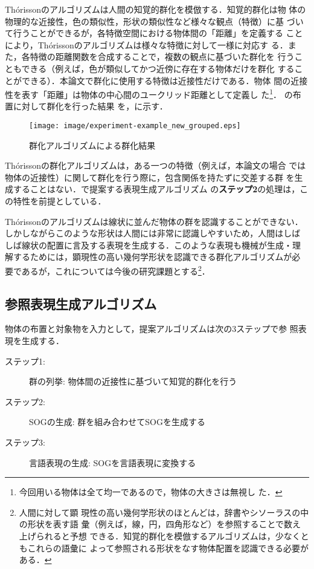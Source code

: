 \documentclass{nlp}
\begin{document}
Th\'{o}rissonのアルゴリズムは人間の知覚的群化を模倣する．知覚的群化は物
体の物理的な近接性，色の類似性，形状の類似性など様々な観点（特徴）に基
づいて行うことができるが，各特徴空間における物体間の「距離」を定義する
ことにより，Th\'{o}rissonのアルゴリズムは様々な特徴に対して一様に対応す
る．また，各特徴の距離関数を合成することで，複数の観点に基づいた群化を
行うこともできる（例えば，色が類似してかつ近傍に存在する物体だけを群化
することができる）．本論文で群化に使用する特徴は近接性だけである．物体
間の近接性を表す「距離」は物体の中心間のユークリッド距離として定義し
た\footnote{今回用いる物体は全て均一であるので，物体の大きさは無視し
  た．}． の布置に対して群化を行った結果
を，に示す．

\begin{figure}[tb]
  \centering
  \texttt{[image: image/experiment-example\_new\_grouped.eps]}
  \caption{群化アルゴリズムによる群化結果}
  \label{grouped}
\end{figure}

Th\'{o}rissonの群化アルゴリズムは，ある一つの特徴（例えば，本論文の場合
では物体の近接性）に関して群化を行う際に，包含関係を持たずに交差する群
を生成することはない．で提案する表現生成アルゴリズム
の\textbf{ステップ2}の処理は，この特性を前提としている．

Th\'orissonのアルゴリズムは線状に並んだ物体の群を認識することができない．
しかしながらこのような形状は人間には非常に認識しやすいため，人間はしば
しば線状の配置に言及する表現を生成する．このような表現も機械が生成・理
解するためには，顕現性の高い幾何学形状を認識できる群化アルゴリズムが必
要であるが，これについては今後の研究課題とする\footnote{ 人間に対して顕
  現性の高い幾何学形状のほとんどは，辞書やシソーラスの中の形状を表す語
  彙（例えば，線，円，四角形など）を参照することで数え上げられると予想
  できる．知覚的群化を模倣するアルゴリズムは，少なくともこれらの語彙に
  よって参照される形状をなす物体配置を認識できる必要がある．}．

\subsection{参照表現生成アルゴリズム}
\label{sec:method}

物体の布置と対象物を入力として，提案アルゴリズムは次の3ステップで参
照表現を生成する．
\begin{description}
\item[ステップ1:] 群の列挙: 物体間の近接性に基づいて知覚的群化を行う
\item[ステップ2:] SOGの生成: 群を組み合わせてSOGを生成する
\item[ステップ3:] 言語表現の生成: SOGを言語表現に変換する
\end{description}
\end{document}
